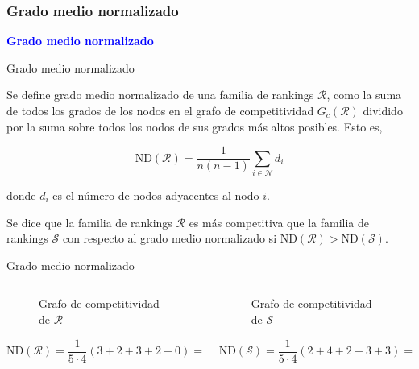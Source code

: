\documentclass[10pt]{beamer}
\begin{document}
	\subsubsection{Grado medio normalizado}
	
	\begin{frame}
		\begin{center}
			\Huge\textbf{\textsf{\textcolor{blue}{Grado medio normalizado}}}
		\end{center}
	\end{frame}
	
	\begin{frame}{Grado medio normalizado}
		\begin{defi}
			Se define grado medio normalizado de una familia de rankings $\mathcal{R}$, como la suma de todos los grados de los nodos en el grafo de competitividad $G_c(\mathcal{R})$ dividido por la suma sobre todos los nodos de sus grados más altos posibles. Esto es,
			
			\begin{equation}
			\mathrm{ND}(\mathcal{R}) = \dfrac{1}{n(n-1)} \sum_{i \in \mathcal{N}} d_i
			\end{equation}
			
			donde $d_i$ es el número de nodos adyacentes al nodo  $i$.
		\end{defi}
		
		\begin{defi}
			Se dice que la familia de rankings $\mathcal{R}$ es más competitiva que la familia de rankings $\mathcal{S}$ con respecto al grado medio normalizado si $\mathrm{ND}(\mathcal{R}) > \mathrm{ND}(\mathcal{S})$.
		\end{defi}
	\end{frame}
	
	\begin{frame}{Grado medio normalizado}
		\begin{ejemplo}
			\begin{columns}[t] %
				\begin{column}{.50\textwidth}
					\begin{figure}
						\centering
						\resizebox{!}{0.3\textheight}{\ejemplografocompetitividad}
						\caption{Grafo de competitividad de $\mathcal{R}$}
					\end{figure}
					\[ \mathrm{ND}(\mathcal{R}) = \dfrac{1}{5\cdot 4} (3 + 2 + 3 + 2 + 0) =  \dfrac{1}{2} \]
				\end{column}%
				\hfill%
				\begin{column}{.50\textwidth}
					\begin{figure}
						\centering
						\resizebox{!}{0.3\textheight}{\ejemplogradomedio}
						\caption{Grafo de competitividad de $\mathcal{S}$}
					\end{figure}
					\[ \mathrm{ND}(\mathcal{S}) = \dfrac{1}{5\cdot 4} (2 + 4 + 2 + 3 + 3) =  \dfrac{7}{10} \]
				\end{column}%
			\end{columns}
		\end{ejemplo}
	\end{frame}
	
\end{document}
